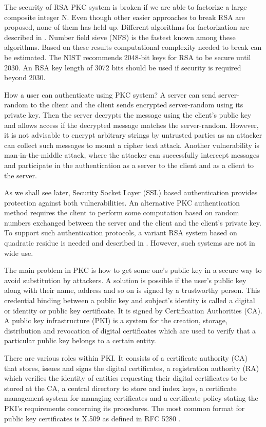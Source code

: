 \begin{multicols}{2}
The security of RSA PKC system is broken if we are able to factorize a large composite integer N. Even though other easier approaches to break RSA are proposed, none of them has held up. Different algorithms for factorization are described in \cite{chap2-key1}. Number field sieve (NFS) is the fastest known among these algorithms. Based on these results computational complexity needed to break can be estimated. The NIST recommends 2048-bit keys for RSA to be secure until 2030. An RSA key length of 3072 bits should be used if security is required beyond 2030. 

How a user can authenticate using PKC system? A server can send server-random to the client and the client sends encrypted server-random using its private key. Then the server decrypts the message using the client's public key and allows access if the decrypted message matches the server-random. However, it is not advisable to encrypt arbitrary strings by untrusted parties as an attacker can collect such messages to mount a cipher text attack. Another vulnerability is man-in-the-middle attack, where the attacker can successfully intercept messages and participate in the authentication as a server to the client and as a client to the server.

As we shall see later, Security Socket Layer (SSL) based authentication provides protection against both vulnerabilities. An alternative PKC authentication method requires the client to perform some computation based on random numbers exchanged between the server and the client and the client's private key. To support such authentication protocols, a variant RSA system based on quadratic residue is needed and described in \cite{chap2-key1}. However, such systems are not in wide use. 

The main problem in PKC is how to get some one's public key in a secure way to avoid substitution by attackers. A solution is possible if the user's public key along with their name, address and so on is signed by a trustworthy person. This credential binding between a public key and subject's identity is called a digital or identity or public key certificate. It is signed by Certification Authorities (CA). A public key infrastructure (PKI) is a system for the creation, storage, distribution and revocation of digital certificates which are used to verify that a particular public key belongs to a certain entity. 

There are various roles within PKI. It consists of a certificate authority (CA) that stores, issues and signs the digital certificates, a registration authority (RA) which verifies the identity of entities requesting their digital certificates to be stored at the CA, a central directory to store and index keys, a certificate management system for managing certificates and a certificate policy stating the PKI's requirements concerning its procedures. The most common format for public key certificates is X.509 as defined in RFC 5280 \cite{chap2-key15}.


\end{multicols}
